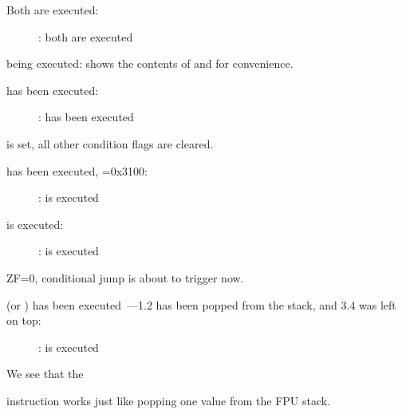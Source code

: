 ﻿\clearpage
{}
\myindex{\olly}

Both \FLD are executed:

\begin{figure}[H]
\centering
{}
\caption{\olly: both \FLD are executed}
\label{fig:FPU_comparison_Ox_case1_olly1}
\end{figure}

\FCOM being executed: 
\olly shows the contents of  and  %
for convenience.

\clearpage
\FCOM has been executed:

\begin{figure}[H]
\centering
{}
\caption{\olly: \FCOM has been executed}
\label{fig:FPU_comparison_Ox_case1_olly2}
\end{figure}

\Czero is set, all other condition flags are cleared.

\clearpage
\FNSTSW has been executed, =0x3100:

\begin{figure}[H]
\centering
{}
\caption{\olly: \FNSTSW is executed}
\label{fig:FPU_comparison_Ox_case1_olly3}
\end{figure}

\clearpage
\TEST is executed:

\begin{figure}[H]
\centering
{}
\caption{\olly: \TEST is executed}
\label{fig:FPU_comparison_Ox_case1_olly4}
\end{figure}

ZF=0, conditional jump is about to trigger now.

\clearpage
{} (or \FSTP {}) has been executed~---1.2 has been popped from the stack, and 3.4 was left on top:

\begin{figure}[H]
\centering
{}
\caption{\olly: \FSTP is executed}
\label{fig:FPU_comparison_Ox_case1_olly5}
\end{figure}

We see that the  

instruction works just like popping one value from the FPU stack.

